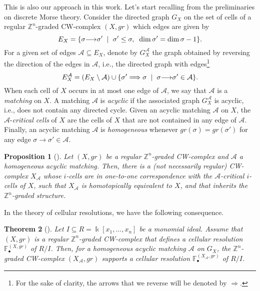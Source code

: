 \documentclass[12pt]{amsart}
\newtheorem{theorem}{Theorem}[section]
\newtheorem{proposition}[theorem]{Proposition}
\theoremstyle{definition}
\theoremstyle{remark}
\numberwithin{equation}{section}
\newcommand{\bZ}{{\mathbb{Z}}}
\newcommand{\cA}{{\mathcal A}}
\newcommand{\lra}{{\longrightarrow}}
\newcommand\kk{\Bbbk}
\begin{document}
This is also our approach in this work. Let's start recalling from \cite{BW} the preliminaries on discrete Morse theory.
Consider the directed graph $G_X$ on the set of cells of a regular $\bZ^n$-graded CW-complex $(X,gr)$ which edges are given by
$$E_X=\{ \sigma \lra \sigma' \hskip 2mm | \hskip 2mm  \sigma' \leq \sigma, \hskip 2mm   \dim \sigma' = \dim \sigma -1 \}.$$
For a given set of edges $\cA \subseteq E_X$, denote by $G_X^{\cA}$ the graph obtained by reversing the direction
of the edges in $\cA$, i.e., the directed graph with edges\footnote{For the sake of clarity, the arrows that we reverse will be denoted
by $\Longrightarrow$.}
$$E_X^{\cA}= (E_X \setminus \cA) \cup \{ \sigma' \Longrightarrow \sigma \hskip 2mm | \hskip 2mm  \sigma \lra \sigma' \in \cA \}.$$
%
%
When each cell of $X$ occurs in at most one edge of $\cA$, we say that $\cA$ is a {\it matching} on $X$.
A matching $\cA$ is {\it acyclic} if the associated graph $G_X^{\cA}$ is acyclic, i.e., does not
contain any directed cycle.
Given an acyclic matching  $\cA$ on $X$, the $\cA$-{\it critical cells} of $X$ are the cells of $X$ that are
not contained in any edge of $\cA$.
Finally, an acyclic matching $\cA$ is {\it homogeneous} whenever $gr(\sigma)=gr(\sigma')$
for any edge $\sigma \lra \sigma' \in \cA$.
%
%

\begin{proposition}[{\cite[Proposition 1.2]{BW}}]
Let $(X,gr)$ be a regular $\bZ^n$-graded CW-complex and $\cA$ a homogeneous acyclic matching. Then, there is a
{\rm(}not necessarily regular{\rm)} CW-complex $X_{\cA}$
whose $i$-cells are in one-to-one correspondence with the $\cA$-critical $i$-cells of $X$, such that $X_{\cA}$ is
homotopically equivalent to $X$, and that inherits the $\bZ^n$-graded structure.
\end{proposition}

In the theory of cellular resolutions, we have the following consequence.

\begin{theorem}[{\cite[Theorem 1.3]{BW}}]
Let $I\subseteq R=\kk[x_1,\dots, x_n]$ be a monomial ideal. Assume that $(X,gr)$ is a regular $\bZ^n$-graded
 CW-complex that defines a cellular resolution $\mathbb{F}_{\bullet}^{(X,gr)}$ of $R/I$. Then,  for
a homogeneous acyclic  matching $\cA$ on $G_X$, the $\bZ^n$-graded CW-complex $(X_{\cA},gr)$ supports a cellular
resolution $\mathbb{F}_{\bullet}^{(X_{\cA},gr)}$ of $R/I$.
\end{theorem}
\end{document}
